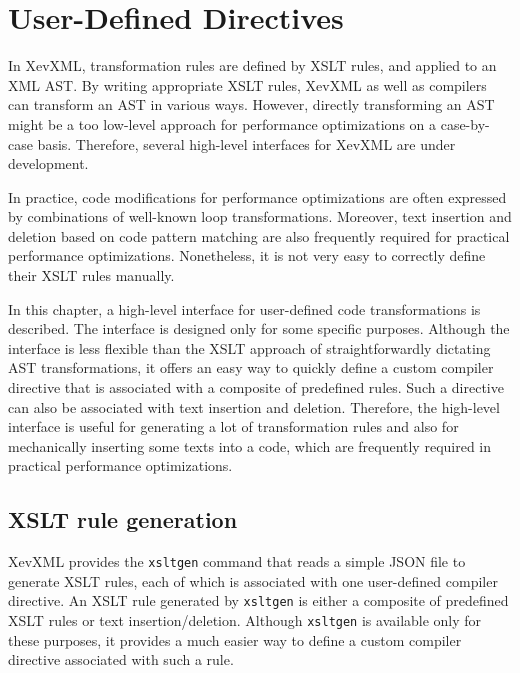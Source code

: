 \chapter{User-Defined Directives}\label{chap:json}


In XevXML, transformation rules are defined by XSLT rules, and applied
to an XML AST. By writing appropriate XSLT rules, XevXML as well as
compilers can transform an AST in various ways.  However, directly
transforming an AST might be a too low-level approach for performance
optimizations on a case-by-case basis.  Therefore, several high-level
interfaces for XevXML are under development.

In practice, code modifications for performance optimizations are often
expressed by combinations of well-known loop transformations.  Moreover,
text insertion and deletion based on code pattern matching are also
frequently required for practical performance optimizations.
Nonetheless, it is not very easy to correctly define their XSLT rules
manually.

In this chapter, a high-level interface for user-defined code
transformations is described. The interface is designed only for some
specific purposes.  Although the interface is less flexible than the
XSLT approach of straightforwardly dictating AST transformations, it
offers an easy way to quickly define a custom compiler directive that is
associated with a composite of predefined rules. Such a directive can
also be associated with text insertion and deletion. Therefore, the
high-level interface is useful for generating a lot of transformation
rules and also for mechanically inserting some texts into a code, which
are frequently required in practical performance optimizations.

\section{XSLT rule generation}
XevXML provides the \texttt{xsltgen} command that reads a simple
JSON\cite{json} file to generate XSLT rules, each of which is associated
with one user-defined compiler directive.  An XSLT rule generated by
\texttt{xsltgen} is either a composite of predefined XSLT rules or text
insertion/deletion.  Although \texttt{xsltgen} is available only for
these purposes, it provides a much easier way to define a custom
compiler directive associated with such a rule.

